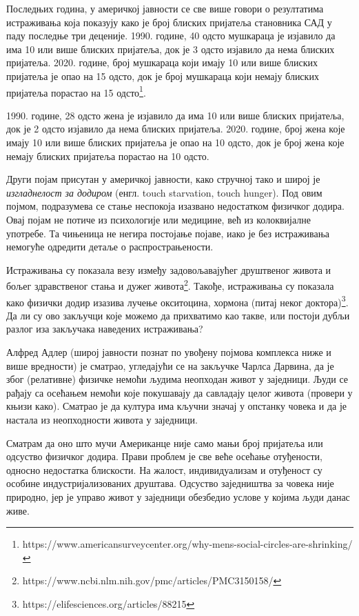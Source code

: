 \documentclass[b5paper]{article}
\begin{document}
\large

Последњих година, у америчкој јавности се све више говори о резултатима истраживања која показују како је број блиских пријатеља становника САД у паду последње три деценије. 1990. године, 40 одсто мушкараца је изјавило да има 10 или више блиских пријатеља, док је 3 одсто изјавило да нема блиских пријатеља. 2020. године, број мушкараца који имају 10 или више блиских пријатеља је опао на 15 одсто, док је број мушкараца који немају блиских пријатеља порастао на 15 одсто\footnote{https://www.americansurveycenter.org/why-mens-social-circles-are-shrinking/}.

1990. године, 28 одсто жена је изјавило да има 10 или више блиских пријатеља, док је 2 одсто изјавило да нема блиских пријатеља. 2020. године, број жена које имају 10 или више блиских пријатеља је опао на 10 одсто, док је број жена које немају блиских пријатеља порастао на 10 одсто.

Други појам присутан у америчкој јавности, како стручној тако и широј је \textit{изгладнелост за додиром} (енгл. touch starvation, touch hunger). Под овим појмом, подразумева се стање неспокоја изазвано недостатком физичког додира. Овај појам не потиче из психологије или медицине, већ из колоквијалне употребе. Та чињеница не негира постојање појаве, иако је без истраживања немогуће одредити детаље о распрострањености.

Истраживања су показала везу између задовољавајућег друштвеног живота и бољег здравственог стања и дужег живота\footnote{https://www.ncbi.nlm.nih.gov/pmc/articles/PMC3150158/}. Такође, истраживања су показала како физички додир изазива лучење окситоцина, хормона (питај неког доктора)\footnote{https://elifesciences.org/articles/88215}. Да ли су ово закључци које можемо да прихватимо као такве, или постоји дубљи разлог иза закључака наведених истраживања?

Алфред Адлер (широј јавности познат по увођену појмова комплекса ниже и више вредности) је сматрао, угледајући се на закључке Чарлса Дарвина, да је због (релативне) физичке немоћи људима неопходан живот у заједници. Људи се рађају са осећањем немоћи које покушавају да савладају целог живота (провери у књизи како). Сматрао је да култура има кључни значај у опстанку човека и да је настала из неопходности живота у заједници.

Сматрам да оно што мучи Американце није само мањи број пријатеља или одсуство физичког додира. Прави проблем је све веће осећање отуђености, односно недостатка блискости. На жалост, индивидуализам и отуђеност су особине индустријализованих друштава. Одсуство заједништва за човека није природно, јер је управо живот у заједници обезбедио услове у којима људи данас живе.
\end{document}
